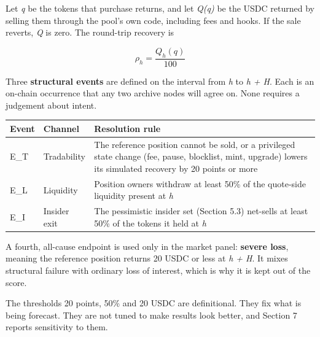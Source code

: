 Let \emph{q} be the tokens that purchase returns, and let \emph{Q(q)} be the USDC returned by selling them through the pool's own code, including fees and hooks. If the sale reverts, \emph{Q} is zero. The round-trip recovery is

\[
\rho_h = \frac{Q_h(q)}{100}
\]

Three \textbf{structural events} are defined on the interval from \emph{h} to \emph{h + H}. Each is an on-chain occurrence that any two archive nodes will agree on. None requires a judgement about intent.

{\def\LTcaptype{none} %
\begin{longtable}[]{@{}
  >{\raggedright\arraybackslash}p{}
  >{\raggedright\arraybackslash}p{}
  >{\raggedright\arraybackslash}p{}@{}}
\toprule\noalign{}
\begin{minipage}[b]{\linewidth}\raggedright
Event
\end{minipage} & \begin{minipage}[b]{\linewidth}\raggedright
Channel
\end{minipage} & \begin{minipage}[b]{\linewidth}\raggedright
Resolution rule
\end{minipage} \\
\midrule\noalign{}
\endhead
\bottomrule\noalign{}
\endlastfoot
E\_T & Tradability & The reference position cannot be sold, or a privileged state change (fee, pause, blocklist, mint, upgrade) lowers its simulated recovery by 20 points or more \\
E\_L & Liquidity & Position owners withdraw at least 50\% of the quote-side liquidity present at \emph{h} \\
E\_I & Insider exit & The pessimistic insider set (Section 5.3) net-sells at least 50\% of the tokens it held at \emph{h} \\
\end{longtable}
}

A fourth, all-cause endpoint is used only in the market panel: \textbf{severe loss}, meaning the reference position returns 20 USDC or less at \emph{h + H}. It mixes structural failure with ordinary loss of interest, which is why it is kept out of the score.

The thresholds 20 points, 50\% and 20 USDC are definitional. They fix what is being forecast. They are not tuned to make results look better, and Section 7 reports sensitivity to them.

